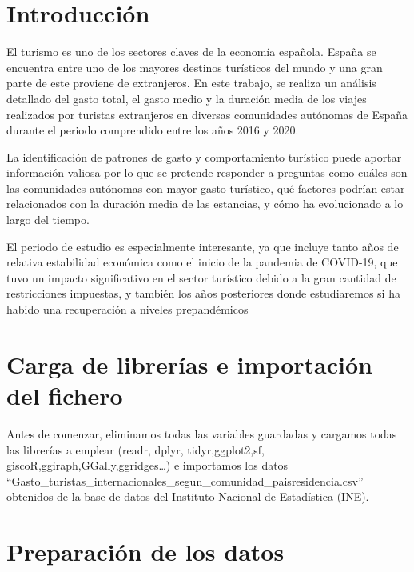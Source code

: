 \documentclass[data,article,submit,moreauthors,pdftex]{Definitions/mdpi}
\begin{document}

\hypertarget{introducciuxf3n}{%
\section{Introducción}\label{introducciuxf3n}}

El turismo es uno de los sectores claves de la economía española. España
se encuentra entre uno de los mayores destinos turísticos del mundo y
una gran parte de este proviene de extranjeros. En este trabajo, se
realiza un análisis detallado del gasto total, el gasto medio y la
duración media de los viajes realizados por turistas extranjeros en
diversas comunidades autónomas de España durante el periodo comprendido
entre los años 2016 y 2020.

La identificación de patrones de gasto y comportamiento turístico puede
aportar información valiosa por lo que se pretende responder a preguntas
como cuáles son las comunidades autónomas con mayor gasto turístico, qué
factores podrían estar relacionados con la duración media de las
estancias, y cómo ha evolucionado a lo largo del tiempo.

El periodo de estudio es especialmente interesante, ya que incluye tanto
años de relativa estabilidad económica como el inicio de la pandemia de
COVID-19, que tuvo un impacto significativo en el sector turístico
debido a la gran cantidad de restricciones impuestas, y también los años
posteriores donde estudiaremos si ha habido una recuperación a niveles
prepandémicos

\hypertarget{carga-de-libreruxedas-e-importaciuxf3n-del-fichero}{%
\section{Carga de librerías e importación del
fichero}\label{carga-de-libreruxedas-e-importaciuxf3n-del-fichero}}

Antes de comenzar, eliminamos todas las variables guardadas y cargamos
todas las librerías a emplear (readr, dplyr, tidyr,ggplot2,sf,
giscoR,ggiraph,GGally,ggridges\ldots) e importamos los datos
``Gasto\_turistas\_internacionales\_segun\_comunidad\_paisresidencia.csv''
obtenidos de la base de datos del Instituto Nacional de Estadística
(INE).

\hypertarget{preparaciuxf3n-de-los-datos}{%
\section{Preparación de los datos}\label{preparaciuxf3n-de-los-datos}}
\end{document}

